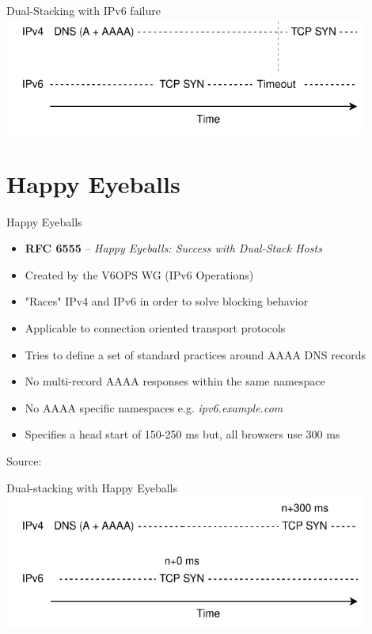 \documentclass[aspectratio=169]{beamer}
\begin{document}
\begin{frame}{Dual-Stacking with IPv6 failure}
  \centering
  \includegraphics[width=0.9\textwidth]{nohe.pdf}
\end{frame}

\section{Happy Eyeballs}

\begin{frame}{Happy Eyeballs}
  \begin{itemize}
    \item \textbf{RFC 6555} – \emph{Happy Eyeballs: Success with Dual-Stack Hosts}
    \item Created by the V6OPS WG (IPv6 Operations)
    \item "Races" IPv4 and IPv6 in order to solve blocking behavior
    \item Applicable to connection oriented transport protocols
    \item Tries to define a set of standard practices around AAAA DNS records
    \item No multi-record AAAA responses within the same namespace
    \item No AAAA specific namespaces e.g. \textit{ipv6.example.com}
    \item Specifies a head start of 150-250 ms but, all browsers use 300 ms
  \end{itemize}
  \centering
  {\tiny Source: \parencite{wingHappyEyeballsSuccess2012}}
\end{frame}

\begin{frame}{Dual-stacking with Happy Eyeballs}
  \centering
  \includegraphics[width=0.9\textwidth]{withhe.pdf}
\end{frame}
\end{document}
